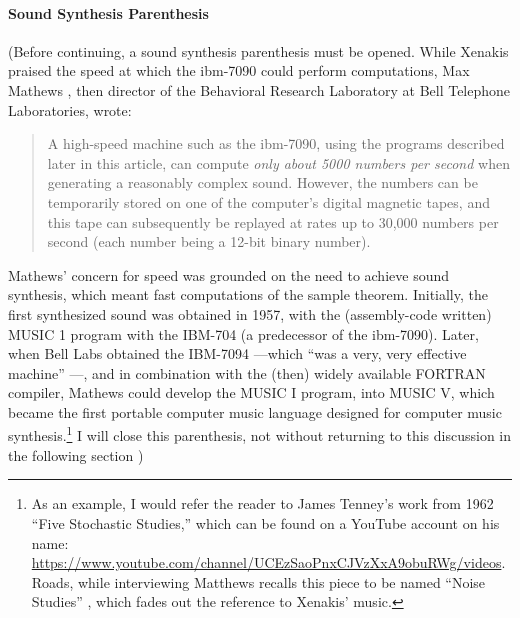 \paragraph{Sound Synthesis Parenthesis}
(Before continuing, a sound synthesis parenthesis must be opened. While Xenakis praised the speed at which the \gls{ibm-7090} could perform computations, Max Mathews \parencite{Mat63:The}, then director of the Behavioral Research Laboratory at Bell Telephone Laboratories, wrote:

\begin{quote}
	A high-speed machine such as the \gls{ibm-7090}, using the programs described later in this article, can compute \textit{only about 5000 numbers per second} when generating a reasonably complex sound. However, the numbers can be temporarily stored on one of the computer's digital magnetic tapes, and this tape can subsequently be replayed at rates up to 30,000 numbers per second (each number being a 12-bit binary number). \im \parencite[553]{Mat63:The}
\end{quote}

Mathews' concern for speed was grounded on the need to achieve sound synthesis, which meant fast computations of the sample theorem. Initially, the first synthesized sound was obtained in 1957, with the (assembly-code written) MUSIC 1 program with the IBM-704 (a predecessor of the \gls{ibm-7090}). Later, when Bell Labs obtained the IBM-7094 ---which ``was a very, very effective machine'' \parencite[16]{Roa80:Int}---, and in combination with the (then) widely available FORTRAN compiler, Mathews could develop the MUSIC I program, into MUSIC V, which became the first portable computer music language designed for computer music synthesis.\footnote{As an example, I would refer the reader to James Tenney's work from 1962 ``Five Stochastic Studies,'' which can be found on a YouTube account on his name: \url{https://www.youtube.com/channel/UCEzSaoPnxCJVzXxA9obuRWg/videos}. Roads, while interviewing Matthews recalls this piece to be named ``Noise Studies'' \parencite[18]{Roa80:Int}, which fades out the reference to Xenakis' music.} I will close this parenthesis, not without returning to this discussion in the following section )


